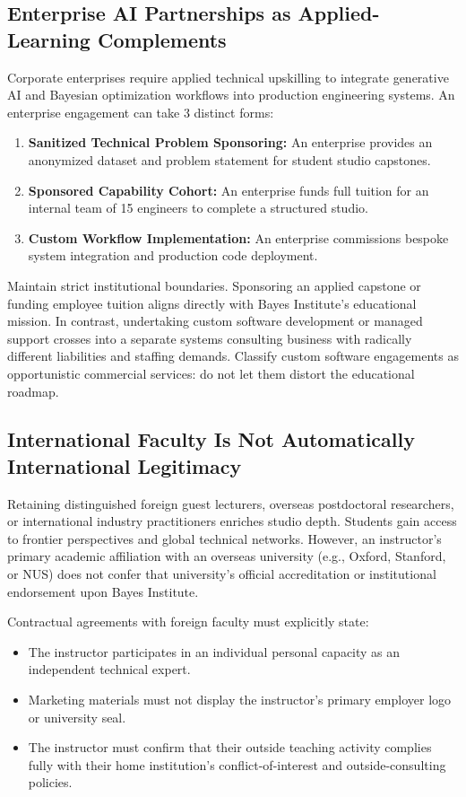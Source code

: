 \subsection{Enterprise AI Partnerships as Applied-Learning Complements}
\label{sec:enterprise_ai_partnerships}

Corporate enterprises require applied technical upskilling to integrate generative AI and Bayesian optimization workflows into production engineering systems. An enterprise engagement can take 3 distinct forms:
\begin{enumerate}
\item \textbf{Sanitized Technical Problem Sponsoring:} An enterprise provides an anonymized dataset and problem statement for student studio capstones.
\item \textbf{Sponsored Capability Cohort:} An enterprise funds full tuition for an internal team of 15 engineers to complete a structured studio.
\item \textbf{Custom Workflow Implementation:} An enterprise commissions bespoke system integration and production code deployment.
\end{enumerate}
Maintain strict institutional boundaries. Sponsoring an applied capstone or funding employee tuition aligns directly with Bayes Institute's educational mission. In contrast, undertaking custom software development or managed support crosses into a separate systems consulting business with radically different liabilities and staffing demands. Classify custom software engagements as opportunistic commercial services: do not let them distort the educational roadmap.

\subsection{International Faculty Is Not Automatically International Legitimacy}
\label{sec:international_faculty_versus_legitimacy}

Retaining distinguished foreign guest lecturers, overseas postdoctoral researchers, or international industry practitioners enriches studio depth. Students gain access to frontier perspectives and global technical networks. However, an instructor's primary academic affiliation with an overseas university (e.g., Oxford, Stanford, or NUS) does not confer that university's official accreditation or institutional endorsement upon Bayes Institute.

Contractual agreements with foreign faculty must explicitly state:
\begin{itemize}
\item The instructor participates in an individual personal capacity as an independent technical expert.
\item Marketing materials must not display the instructor's primary employer logo or university seal.
\item The instructor must confirm that their outside teaching activity complies fully with their home institution's conflict-of-interest and outside-consulting policies.
\end{itemize}

